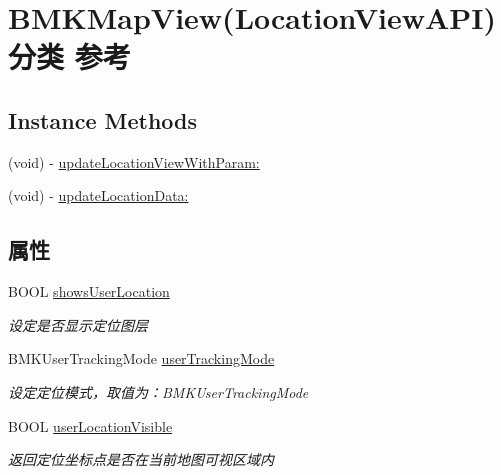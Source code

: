 \hypertarget{category_b_m_k_map_view_07_location_view_a_p_i_08}{}\section{B\+M\+K\+Map\+View(Location\+View\+A\+P\+I)分类 参考}
\label{category_b_m_k_map_view_07_location_view_a_p_i_08}
\subsection*{Instance Methods}
\begin{DoxyCompactItemize}
\item 
(void) -\/ \hyperlink{category_b_m_k_map_view_07_location_view_a_p_i_08_afc9842b45a41341b3ea5d2e632344382}{update\+Location\+View\+With\+Param\+:}
\item 
(void) -\/ \hyperlink{category_b_m_k_map_view_07_location_view_a_p_i_08_a72c1c3b690379ecf804cc20ddf5840e9}{update\+Location\+Data\+:}
\end{DoxyCompactItemize}
\subsection*{属性}
\begin{DoxyCompactItemize}
\item 
\hypertarget{category_b_m_k_map_view_07_location_view_a_p_i_08_a6e18e9532c42e940eca7739378348af4}{}B\+O\+O\+L \hyperlink{category_b_m_k_map_view_07_location_view_a_p_i_08_a6e18e9532c42e940eca7739378348af4}{shows\+User\+Location}\label{category_b_m_k_map_view_07_location_view_a_p_i_08_a6e18e9532c42e940eca7739378348af4}

\begin{DoxyCompactList}\small\item\em 设定是否显示定位图层 \end{DoxyCompactList}\item 
\hypertarget{category_b_m_k_map_view_07_location_view_a_p_i_08_aac0adfff30441312452cef6844ef818b}{}B\+M\+K\+User\+Tracking\+Mode \hyperlink{category_b_m_k_map_view_07_location_view_a_p_i_08_aac0adfff30441312452cef6844ef818b}{user\+Tracking\+Mode}\label{category_b_m_k_map_view_07_location_view_a_p_i_08_aac0adfff30441312452cef6844ef818b}

\begin{DoxyCompactList}\small\item\em 设定定位模式，取值为：\+B\+M\+K\+User\+Tracking\+Mode \end{DoxyCompactList}\item 
\hypertarget{category_b_m_k_map_view_07_location_view_a_p_i_08_ada9feb9e53eb9611b57a596c572bb280}{}B\+O\+O\+L \hyperlink{category_b_m_k_map_view_07_location_view_a_p_i_08_ada9feb9e53eb9611b57a596c572bb280}{user\+Location\+Visible}\label{category_b_m_k_map_view_07_location_view_a_p_i_08_ada9feb9e53eb9611b57a596c572bb280}

\begin{DoxyCompactList}\small\item\em 返回定位坐标点是否在当前地图可视区域内 \end{DoxyCompactList}\end{DoxyCompactItemize}


